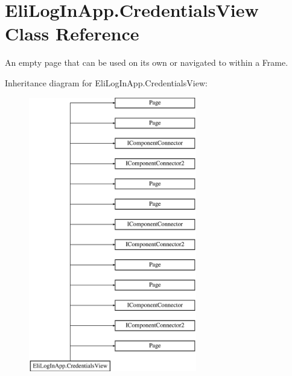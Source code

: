 \hypertarget{class_eli_log_in_app_1_1_credentials_view}{}\section{Eli\+Log\+In\+App.\+Credentials\+View Class Reference}
\label{class_eli_log_in_app_1_1_credentials_view}


An empty page that can be used on its own or navigated to within a Frame.  


Inheritance diagram for Eli\+Log\+In\+App.\+Credentials\+View\+:\begin{figure}[H]
\begin{center}
\leavevmode
\includegraphics[height=12.000000cm]{d5/d97/class_eli_log_in_app_1_1_credentials_view}
\end{center}
\end{figure}
